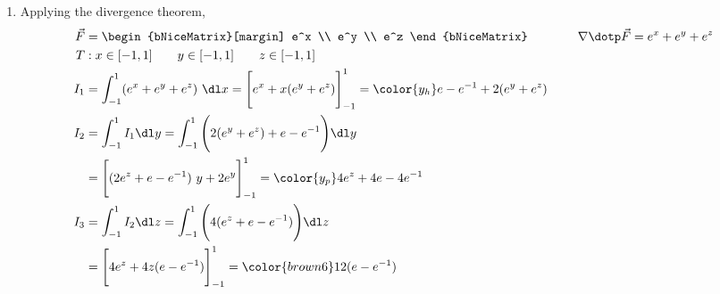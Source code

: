 \begin{enumerate}
     \item Applying the divergence theorem,
           \begin{align}
                \vec{F} & = \begin{bNiceMatrix}[margin]
                                 e^x \\ e^y \\ e^z
                            \end{bNiceMatrix} \qquad\qquad
                \nabla \dotp \vec{F} = e^x + e^y + e^z                              \\
                T       & : x \in [-1, 1] \qquad y \in [-1, 1] \qquad z \in [-1, 1] \\
                I_1     & = \int_{-1}^{1} (e^x + e^y + e^z) \ \dl x
                = \Bigg[ e^x + x(e^y + e^z) \Bigg]_{-1}^{1}
                = {\color{y_h} e - e^{-1} + 2(e^y + e^z)}                           \\
                I_2     & = \int_{-1}^{1} I_1 \dl y
                = \int_{-1}^{1} \Bigg( 2(e^y + e^z) + e - e^{-1} \Bigg) \dl y       \\
                        & = \Bigg[ (2e^z + e - e^{-1})\ y + 2e^y \Bigg]_{-1}^{1}
                = {\color{y_p} 4e^z + 4e - 4e^{-1} }                                \\
                I_3     & = \int_{-1}^{1} I_2 \dl z = \int_{-1}^{1}
                \Bigg( 4(e^z + e - e^{-1}) \Bigg) \dl z                             \\
                        & = \Bigg[ 4e^z + 4z(e - e^{-1}) \Bigg]_{-1}^{1}
                = {\color{brown6} 12 (e - e^{-1})}
           \end{align}


\end{enumerate}
